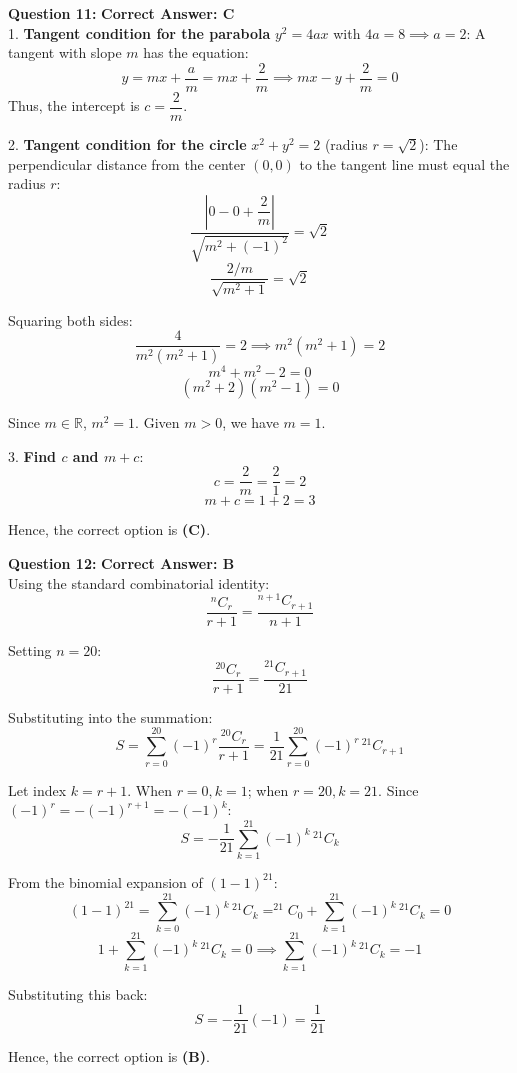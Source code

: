\documentclass[11pt,a4paper]{article}
\begin{document}
\begin{tcolorbox}[solbox]
\textbf{\textcolor{primaryDark}{Question 11:}} \hfill \textbf{\textcolor{l1Green}{Correct Answer: C}}\\
\vspace{4pt}
1. \textbf{Tangent condition for the parabola} $y^2 = 4ax$ with $4a = 8 \implies a = 2$:
A tangent with slope $m$ has the equation:
$$y = mx + \frac{a}{m} = mx + \frac{2}{m} \implies mx - y + \frac{2}{m} = 0$$
Thus, the intercept is $c = \dfrac{2}{m}$.

2. \textbf{Tangent condition for the circle} $x^2 + y^2 = 2$ (radius $r = \sqrt{2}$):
The perpendicular distance from the center $(0,0)$ to the tangent line must equal the radius $r$:
$$\frac{\left|0 - 0 + \dfrac{2}{m}\right|}{\sqrt{m^2 + (-1)^2}} = \sqrt{2}$$
$$\frac{2/m}{\sqrt{m^2 + 1}} = \sqrt{2}$$

Squaring both sides:
$$\frac{4}{m^2(m^2 + 1)} = 2 \implies m^2(m^2 + 1) = 2$$
$$m^4 + m^2 - 2 = 0$$
$$(m^2 + 2)(m^2 - 1) = 0$$

Since $m \in \mathbb{R}$, $m^2 = 1$. Given $m > 0$, we have $m = 1$.

3. \textbf{Find $c$ and $m + c$}:
$$c = \frac{2}{m} = \frac{2}{1} = 2$$
$$m + c = 1 + 2 = 3$$

Hence, the correct option is \textbf{(C)}.
\end{tcolorbox}

\begin{tcolorbox}[solbox]
\textbf{\textcolor{primaryDark}{Question 12:}} \hfill \textbf{\textcolor{l1Green}{Correct Answer: B}}\\
\vspace{4pt}
Using the standard combinatorial identity:
$$\frac{^nC_r}{r + 1} = \frac{^{n+1}C_{r+1}}{n + 1}$$

Setting $n = 20$:
$$\frac{^{20}C_r}{r + 1} = \frac{^{21}C_{r+1}}{21}$$

Substituting into the summation:
$$S = \sum_{r=0}^{20} (-1)^r \frac{^{20}C_r}{r + 1} = \frac{1}{21} \sum_{r=0}^{20} (-1)^r \, ^{21}C_{r+1}$$

Let index $k = r + 1$. When $r = 0, k = 1$; when $r = 20, k = 21$.
Since $(-1)^r = -(-1)^{r+1} = -(-1)^k$:
$$S = -\frac{1}{21} \sum_{k=1}^{21} (-1)^k \, ^{21}C_k$$

From the binomial expansion of $(1 - 1)^{21}$:
$$(1 - 1)^{21} = \sum_{k=0}^{21} (-1)^k \, ^{21}C_k = ^{21}C_0 + \sum_{k=1}^{21} (-1)^k \, ^{21}C_k = 0$$
$$1 + \sum_{k=1}^{21} (-1)^k \, ^{21}C_k = 0 \implies \sum_{k=1}^{21} (-1)^k \, ^{21}C_k = -1$$

Substituting this back:
$$S = -\frac{1}{21} (-1) = \frac{1}{21}$$

Hence, the correct option is \textbf{(B)}.
\end{tcolorbox}
\end{document}

